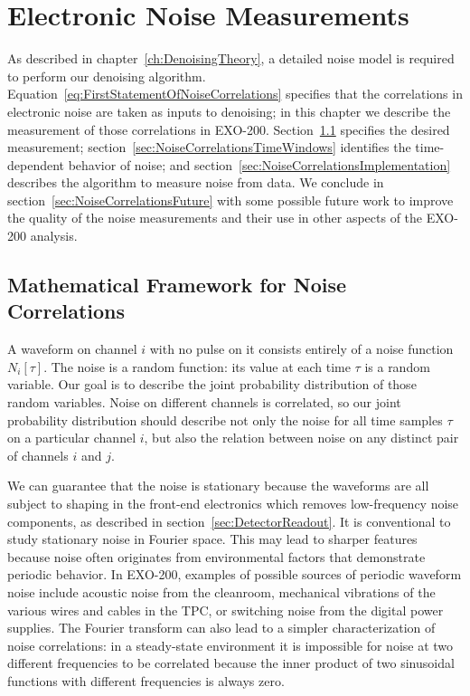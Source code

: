 \renewcommand{\thechapter}{5}
\chapter{Electronic Noise Measurements}
\label{ch:NoiseMeasurements}

As described in chapter~\ref{ch:DenoisingTheory}, a detailed noise model is required to perform our denoising algorithm.  Equation~\ref{eq:FirstStatementOfNoiseCorrelations} specifies that the correlations in electronic noise are taken as inputs to denoising; in this chapter we describe the measurement of those correlations in EXO-200.  Section~\ref{sec:NoiseCorrelationsMath} specifies the desired measurement; section~\ref{sec:NoiseCorrelationsTimeWindows} identifies the time-dependent behavior of noise; and section~\ref{sec:NoiseCorrelationsImplementation} describes the algorithm to measure noise from data.  We conclude in section~\ref{sec:NoiseCorrelationsFuture} with some possible future work to improve the quality of the noise measurements and their use in other aspects of the EXO-200 analysis.

\section{Mathematical Framework for Noise Correlations}\label{sec:NoiseCorrelationsMath}

A waveform on channel $i$ with no pulse on it consists entirely of a noise function $N_i[\tau]$.  The noise is a random function:  its value at each time $\tau$ is a random variable.  Our goal is to describe the joint probability distribution of those random variables.  Noise on different channels is correlated, so our joint probability distribution should describe not only the noise for all time samples $\tau$ on a particular channel $i$, but also the relation between noise on any distinct pair of channels $i$ and $j$.

We can guarantee that the noise is stationary because the waveforms are all subject to shaping in the front-end electronics which removes low-frequency noise components, as described in section~\ref{sec:DetectorReadout}.  It is conventional to study stationary noise in Fourier space.  This may lead to sharper features because noise often originates from environmental factors that demonstrate periodic behavior. In EXO-200, examples of possible sources of periodic waveform noise include acoustic noise from the cleanroom, mechanical vibrations of the various wires and cables in the TPC, or switching noise from the digital power supplies.  The Fourier transform can also lead to a simpler characterization of noise correlations: in a steady-state environment it is impossible for noise at two different frequencies to be correlated because the inner product of two sinusoidal functions with different frequencies is always zero.

